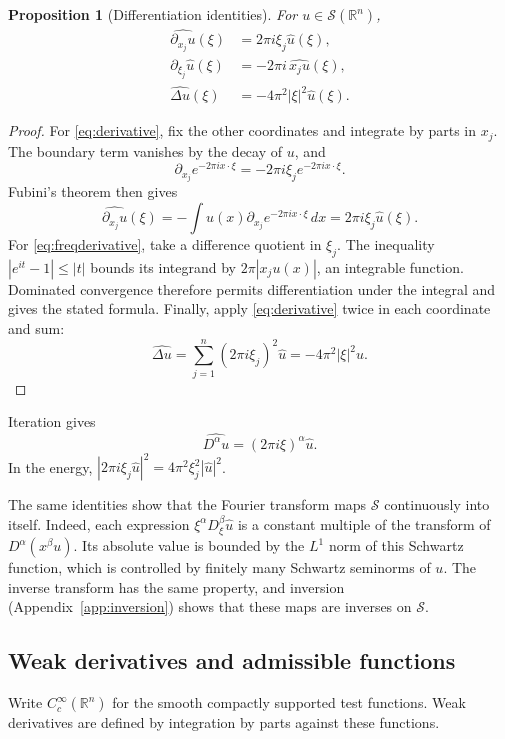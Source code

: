 \documentclass[11pt]{article}
\numberwithin{equation}{section}
\newtheorem{proposition}[theorem]{Proposition}
\theoremstyle{definition}
\theoremstyle{remark}
\newcommand{\R}{\mathbb R}
\newcommand{\Sch}{\mathcal S}
\newcommand{\dd}{\,d}
\newcommand{\wh}[1]{\widehat{#1}}
\begin{document}
\begin{proposition}[Differentiation identities]\label{prop:derivatives}
For \(u\in\Sch(\R^n)\),
\begin{align}
 \wh{\partial_{x_j}u}(\xi)&=2\pi i\xi_j\wh u(\xi),\label{eq:derivative}\\
 \partial_{\xi_j}\wh u(\xi)&=-2\pi i\,\wh{x_ju}(\xi),\label{eq:freqderivative}\\
 \wh{\Delta u}(\xi)&=-4\pi^2|\xi|^2\wh u(\xi).\label{eq:laplace}
\end{align}
\end{proposition}
\begin{proof}
For \eqref{eq:derivative}, fix the other coordinates and integrate by parts in \(x_j\). The boundary term vanishes by the decay of \(u\), and
\[
 \partial_{x_j}e^{-2\pi i x\cdot\xi}
       =-2\pi i\xi_j e^{-2\pi i x\cdot\xi}.
\]
Fubini's theorem then gives
\[
 \wh{\partial_{x_j}u}(\xi)
 =-\int u(x)\partial_{x_j}e^{-2\pi i x\cdot\xi}\dd x
 =2\pi i\xi_j\wh u(\xi).
\]
For \eqref{eq:freqderivative}, take a difference quotient in \(\xi_j\). The inequality \(|e^{it}-1|\le |t|\) bounds its integrand by \(2\pi|x_ju(x)|\), an integrable function. Dominated convergence therefore permits differentiation under the integral and gives the stated formula. Finally, apply \eqref{eq:derivative} twice in each coordinate and sum:
\[
 \wh{\Delta u}=\sum_{j=1}^n(2\pi i\xi_j)^2\wh u
             =-4\pi^2|\xi|^2\wh u.
\]
\end{proof}

Iteration gives
\begin{equation}\label{eq:multi}
 \wh{D^\alpha u}=(2\pi i\xi)^\alpha\wh u.
\end{equation}
In the energy, \(|2\pi i\xi_j\wh u|^2=4\pi^2\xi_j^2|\wh u|^2\).

The same identities show that the Fourier transform maps \(\Sch\) continuously into itself. Indeed, each expression \(\xi^\alpha D_\xi^\beta\wh u\) is a constant multiple of the transform of \(D^\alpha(x^\beta u)\). Its absolute value is bounded by the \(L^1\) norm of this Schwartz function, which is controlled by finitely many Schwartz seminorms of \(u\). The inverse transform has the same property, and inversion (Appendix~\ref{app:inversion}) shows that these maps are inverses on \(\Sch\).

\subsection{Weak derivatives and admissible functions}
Write \(C_c^\infty(\R^n)\) for the smooth compactly supported test functions. Weak derivatives are defined by integration by parts against these functions.
\end{document}
